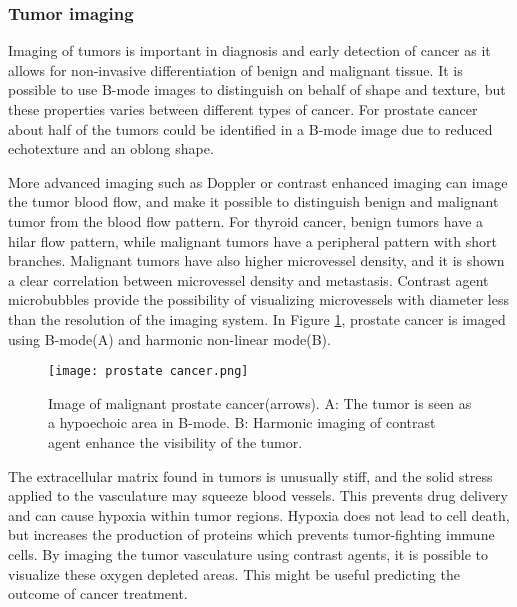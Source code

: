 \subsubsection{Tumor imaging}
Imaging of tumors is important in diagnosis and early detection of cancer as it allows for non-invasive differentiation of benign and malignant tissue. It is possible to use B-mode images to distinguish on behalf of shape and texture, but these properties varies between different types of cancer. For prostate cancer about half of the tumors could be identified in a B-mode image due to reduced echotexture and an oblong shape\cite{Halpern2006}. 

More advanced imaging such as Doppler or contrast enhanced imaging can image the tumor blood flow, and make it possible to distinguish benign and malignant tumor from the blood flow pattern. For thyroid cancer, benign tumors have a hilar flow pattern, while malignant tumors have a peripheral pattern with short branches\cite{Go2003}. Malignant tumors have also higher microvessel density, and it is shown a clear correlation between microvessel density and metastasis\cite{Rifkin1990}. Contrast agent microbubbles provide the possibility of visualizing microvessels with diameter less than the resolution of the imaging system. In Figure \ref{Fig:prostate cancer}, prostate cancer is imaged using B-mode(A) and harmonic non-linear mode(B).

\begin{figure}[h]
  \centering
  \texttt{[image: prostate cancer.png]}
  \caption{Image of malignant prostate cancer(arrows)\cite{Halpern2006}. A: The tumor is seen as a hypoechoic area in B-mode. B: Harmonic imaging of contrast agent enhance the visibility of the tumor.}
  \label{Fig:prostate cancer}
\end{figure}

The extracellular matrix found in tumors is unusually stiff, and the solid stress applied to the vasculature may  squeeze blood vessels. This prevents drug delivery and can cause hypoxia within tumor regions. Hypoxia does not lead to cell death, but increases the production of proteins which prevents tumor-fighting immune cells\cite{Jain2014}. By imaging the tumor vasculature using contrast agents, it is possible to visualize these oxygen depleted areas. This might be useful predicting the outcome of cancer treatment. 


